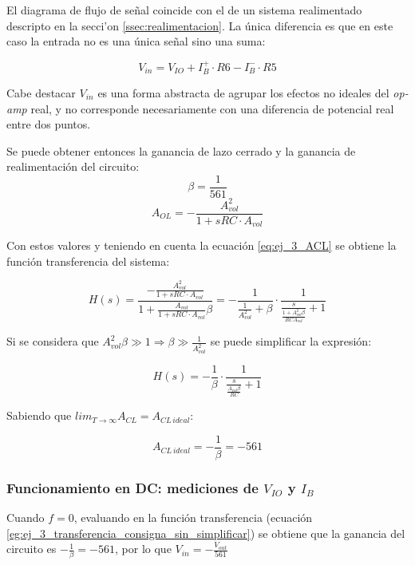 \documentclass[../../main.tex]{subfiles}
\begin{document}
El diagrama de flujo de se\~nal coincide con el de un sistema realimentado descripto en la secci'on \ref{ssec:realimentacion}. La \'unica diferencia es que en este caso la entrada no es una \'unica se\~nal sino una suma:

\begin{equation}
	V_{in} = V_{IO} + I_B^+\cdot R6 - I_B^-\cdot R5
	\label{eq:ej_3_vin_aparente}
\end{equation}

Cabe destacar $V_{in}$ es una forma abstracta de agrupar los efectos no ideales del \textit{op-amp} real, y no corresponde necesariamente con una diferencia de potencial real entre dos puntos.

 Se puede obtener entonces la ganancia de lazo cerrado y la ganancia de realimentaci\'on del circuito:
\[\beta = \frac{1}{561}\]
\[A_{OL} = -\frac{A_{vol}^2}{1+sRC\cdot A_{vol}}\]

Con estos valores y teniendo en cuenta la ecuaci\'on \ref{eq:ej_3_ACL} se obtiene la funci\'on transferencia del sistema:

\begin{equation}
	H(s)=\frac{-\frac{A_{vol}^2}{1+sRC\cdot A_{vol}}}{1+\frac{A_{vol}}{1+sRC\cdot A_{vol}}\beta}
	=-\frac{1}{\frac{1}{A_{vol}^2}+\beta}\cdot \frac{1}{\frac{s}{\frac{1+A_{vol}^2\beta}{RCA_{vol}}} +1}
	\label{eg:ej_3_transferencia_consigna_sin_simplificar}
\end{equation}


Si se considera que $A_{vol}^2\beta \gg 1 \Rightarrow \beta \gg \frac{1}{A_{vol}^2}$ se puede simplificar la expresi\'on:


\begin{equation}
	H(s) = -\frac{1}{\beta}\cdot \frac{1}{\frac{s}{\frac{A_{vol}\beta}{RC}}+1}
	\label{eq:ej_3_transferencia_consigna_simplificada}
\end{equation}


Sabiendo que $lim_{T\rightarrow \infty}A_{CL} = A_{CL\,ideal}$:

\begin{equation}
	A_{CL\,ideal} = -\frac{1}{\beta} = -561
\end{equation}


\subsubsection{Funcionamiento en DC: mediciones de $V_{IO}$ y $I_B$}

Cuando $f=0$, evaluando en la funci\'on transferencia (ecuaci\'on \ref{eg:ej_3_transferencia_consigna_sin_simplificar}) se obtiene que la ganancia del circuito es $-\frac{1}{\beta}=-561$, por lo que $V_{in}=-\frac{V_{out}}{561}$
\end{document}
